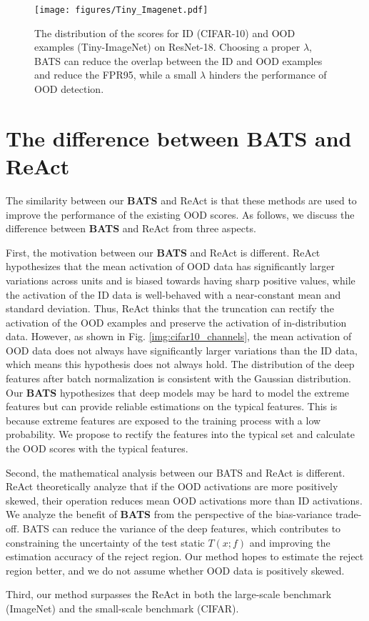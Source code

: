 \documentclass{article}
\begin{document}
\begin{figure}[htbp] 
\centering
\texttt{[image: figures/Tiny\_Imagenet.pdf]}
\caption{The distribution of the scores for ID (CIFAR-10) and OOD examples (Tiny-ImageNet) on ResNet-18. Choosing a proper $\lambda$, BATS can reduce the overlap between the ID and OOD examples and reduce the FPR95, while a small $\lambda$ hinders the performance of OOD detection.}
\label{img:Tiny_Imagenet}
\end{figure} 
 
 
 {
 \section{The difference between BATS and ReAct}
 
 The similarity between our \textbf{BATS} and ReAct is that these methods are used to improve the performance of the existing OOD scores. As follows, we discuss the difference between \textbf{BATS} and ReAct from three aspects.

 First, the motivation between our \textbf{BATS} and ReAct is different. ReAct hypothesizes that the mean activation of OOD data has significantly larger variations across units and is biased towards having sharp positive values, while the activation of the ID data is well-behaved with a near-constant mean and standard deviation. Thus, ReAct thinks that the truncation can rectify the activation of the OOD examples and preserve the activation of in-distribution data.
 However, as shown in Fig. \ref{img:cifar10_channels}, the mean activation of OOD data does not always have significantly larger variations than the ID data, which means this hypothesis does not always hold. 
 The distribution of the deep features after batch normalization is consistent with the Gaussian distribution. Our \textbf{BATS} hypothesizes that deep models may be hard to model the extreme features but can provide reliable estimations on the typical features. This is because extreme features are exposed to the training process with a low probability. We propose to rectify the features into the typical set and calculate the OOD scores with the typical features.

 Second, the mathematical analysis between our BATS and ReAct is different. ReAct theoretically analyze that if the OOD activations are more positively skewed, their operation reduces mean OOD activations more than ID activations.
 We analyze the benefit of \textbf{BATS} from the perspective of the bias-variance trade-off. BATS can reduce the variance of the deep features, which contributes to constraining the uncertainty of the test static $T(x; f)$ and improving the estimation accuracy of the reject region. Our method hopes to estimate the reject region better, and we do not assume whether OOD data is positively skewed.

 Third, our method surpasses the ReAct in both the large-scale benchmark (ImageNet) and the small-scale benchmark (CIFAR).
 
}
\end{document}
